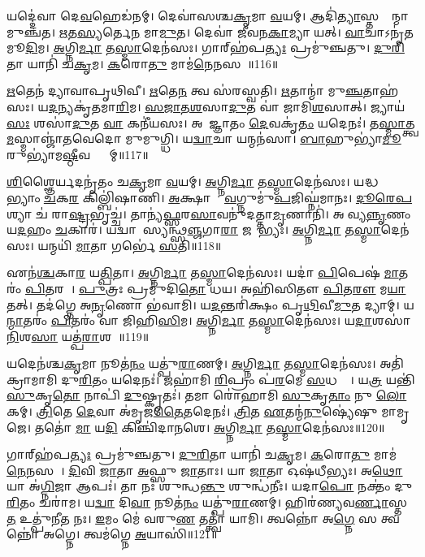 𑌯𑌦𑍍𑌦𑍇॑𑌵𑌾 𑌦𑍇\ul{𑌵}𑌹𑍇𑌡॑𑌨𑌮𑍍।
𑌦𑍇𑌵𑌾॑𑌸𑌶𑍍𑌚\ul{𑌕𑍃}𑌮𑌾 \ul{𑌵}𑌯𑌮𑍍।
𑌆𑌦𑌿॑\ul{𑌤𑍍𑌯𑌾}\-𑌸𑍍𑌤𑌸𑍍𑌮𑌾᳚𑌨𑍍𑌮𑌾 𑌮𑍁𑌞𑍍𑌚𑌤।
\ul{𑌋}𑌤\ul{𑌸𑍍𑌯}𑌰𑍍𑌤𑍇\ul{𑌨} 𑌮𑌾\ul{𑌮𑍁}𑌤।
𑌦𑍇𑌵𑌾॑ 𑌜𑍀𑌵𑌨\ul{𑌕𑌾}𑌮𑍍𑌯𑌾 𑌯𑌤𑍍।
\ul{𑌵𑌾}𑌚𑌾\-𑌽𑌨𑍃॑𑌤𑌮𑍂\ul{𑌦𑌿}𑌮।
\ul{𑌅}𑌗𑍍𑌨𑌿\ul{𑌰𑍍𑌮𑌾} 𑌤\ul{𑌸𑍍𑌮𑌾}𑌦𑍇𑌨॑𑌸𑌃।
𑌗𑌾𑌰𑍍‌\mbox{}𑌹॑𑌪\ul{𑌤𑍍𑌯𑌃} 𑌪𑍍𑌰𑌮𑍁॑𑌞𑍍𑌚𑌤𑍁।
\ul{𑌦𑍁}\ul{𑌰𑌿}𑌤𑌾 𑌯𑌾𑌨𑌿॑ 𑌚\ul{𑌕𑍃}𑌮।
\ul{𑌕}𑌰𑍋\ul{𑌤𑍁} 𑌮𑌾𑌮॑\ul{𑌨𑍇}𑌨𑌸𑌮𑍍᳚॥116॥

\ul{𑌋}𑌤𑍇𑌨॑ 𑌦𑍍𑌯𑌾𑌵𑌾𑌪𑍃𑌥𑌿𑌵𑍀।
\ul{𑌋}𑌤𑍇\ul{𑌨} 𑌤𑍍𑌵 𑌸॑𑌰𑌸𑍍𑌵𑌤𑌿।
\ul{𑌋}𑌤𑌾𑌨𑍍𑌮𑌾॑ 𑌮𑍁\ul{𑌞𑍍𑌚}𑌤𑌾𑌹॑𑌸𑌃।
𑌯\ul{𑌦}𑌨𑍍𑌯𑌕𑍃॑𑌤𑌮𑌾\ul{𑌰𑌿}𑌮।
\ul{𑌸}\ul{𑌜𑌾}\ul{𑌤}\ul{𑌶}\ul{}𑌸𑌾\ul{𑌦𑍁}𑌤 𑌵𑌾॑ 𑌜𑌾𑌮𑌿\ul{𑌶}\ul{}𑌸𑌾𑌤𑍍।
𑌜𑍍𑌯𑌾𑌯॑\ul{𑌸𑌃} 𑌶𑌸𑌾॑\ul{𑌦𑍁}𑌤 \ul{𑌵𑌾} 𑌕𑌨𑍀॑𑌯𑌸𑌃।
𑌅𑌨𑌾᳚𑌜𑍍𑌞𑌾𑌤𑌂 \ul{𑌦𑍇}𑌵𑌕𑍃॑\ul{𑌤𑌂} 𑌯𑌦𑍇𑌨𑌃॑।
𑌤\ul{𑌸𑍍𑌮𑌾}𑌤𑍍𑌤𑍍𑌵\ul{𑌮}𑌸𑍍𑌮𑌾𑌞𑍍𑌜𑌾॑𑌤𑌵𑍇𑌦𑍋 𑌮𑍁𑌮𑍁𑌗𑍍𑌧𑌿।
𑌯\ul{𑌦𑍍𑌵𑌾}𑌚𑌾 𑌯𑌨𑍍𑌮𑌨॑𑌸𑌾।
\ul{𑌬𑌾}𑌹𑍁𑌭𑍍𑌯𑌾॑\ul{𑌮𑍂}𑌰𑍁𑌭𑍍𑌯𑌾॑𑌮\ul{𑌷𑍍𑌠𑍀}𑌵𑌦𑍍𑌭𑍍𑌯𑌾᳚𑌮𑍍॥117॥

\ul{𑌶𑌿}𑌶𑍍𑌞𑍈𑌰𑍍𑌯𑌦𑌨𑍃॑𑌤𑌂 𑌚\ul{𑌕𑍃}𑌮𑌾 \ul{𑌵}𑌯𑌮𑍍।
\ul{𑌅}𑌗𑍍𑌨𑌿\ul{𑌰𑍍𑌮𑌾} 𑌤\ul{𑌸𑍍𑌮𑌾}𑌦𑍇𑌨॑𑌸𑌃।
𑌯𑌦𑍍𑌧𑌸𑍍𑌤𑌾᳚𑌭𑍍𑌯𑌾𑌂 \ul{𑌚}𑌕\ul{𑌰} 𑌕𑌿𑌲𑍍𑌬𑌿॑𑌷𑌾𑌣𑌿।
\ul{𑌅}𑌕𑍍𑌷𑌾𑌣𑌾𑌂᳚ \ul{𑌵}𑌗𑍍𑌨𑍁𑌮𑍁॑\ul{𑌪}𑌜𑌿𑌘𑍍𑌨॑𑌮𑌾𑌨𑌃।
\ul{𑌦𑍂}\ul{𑌰𑍇}\ul{𑌪}𑌶𑍍𑌯𑌾 𑌚॑ 𑌰𑌾\ul{𑌷𑍍𑌟𑍍𑌰}𑌭𑍃𑌚𑍍𑌚॑।
𑌤𑌾𑌨𑍍𑌯॑\ul{𑌫𑍍𑌸}𑌰\ul{𑌸𑌾}𑌵𑌨𑍁॑𑌦𑌤𑍍𑌤𑌾\ul{𑌮𑍃}𑌣𑌾𑌨𑌿॑।
𑌅𑌦𑍀᳚𑌵𑍍𑌯\ul{𑌨𑍍𑌨𑍃}𑌣𑌂 𑌯\ul{𑌦}𑌹𑌂 \ul{𑌚}𑌕𑌾𑌰॑।
𑌯𑌦𑍍𑌵𑌾𑌦𑌾᳚𑌸𑍍𑌯𑌨𑍍𑌥𑍍𑌸\ul{𑌞𑍍𑌜}𑌗𑌾\ul{𑌰𑌾} 𑌜𑌨𑍇᳚𑌭𑍍𑌯𑌃।
\ul{𑌅}𑌗𑍍𑌨𑌿\ul{𑌰𑍍𑌮𑌾} 𑌤\ul{𑌸𑍍𑌮𑌾}𑌦𑍇𑌨॑𑌸𑌃।
𑌯𑌨𑍍𑌮𑌯𑌿॑ \ul{𑌮𑌾}𑌤𑌾 𑌗𑌰𑍍𑌭𑍇॑ \ul{𑌸}𑌤𑌿॥118॥

𑌏𑌨॑\ul{𑌶𑍍𑌚}𑌕𑌾\ul{𑌰} 𑌯\ul{𑌤𑍍𑌪𑌿}𑌤𑌾।
\ul{𑌅}𑌗𑍍𑌨𑌿\ul{𑌰𑍍𑌮𑌾} 𑌤\ul{𑌸𑍍𑌮𑌾}𑌦𑍇𑌨॑𑌸𑌃।
𑌯𑌦𑌾॑ \ul{𑌪𑌿}𑌪𑍇𑌷॑ \ul{𑌮𑌾}𑌤𑌰𑌂॑ \ul{𑌪𑌿}𑌤𑌰𑌮𑍍᳚।
\ul{𑌪𑍁}𑌤𑍍𑌰𑌃 𑌪𑍍𑌰𑌮𑍁॑𑌦𑌿\ul{𑌤𑍋} 𑌧𑌯\sn{}।
𑌅𑌹𑌿॑𑌸𑌿𑌤𑍗 \ul{𑌪𑌿}𑌤\ul{𑌰𑍗} 𑌮\ul{𑌯𑌾} 𑌤𑌤𑍍।
𑌤𑌦॑𑌗𑍍𑌨𑍇 𑌅\ul{𑌨𑍃}𑌣𑍋 𑌭॑𑌵𑌾𑌮𑌿।
𑌯\ul{𑌦}𑌨𑍍𑌤𑌰𑌿॑𑌕𑍍𑌷𑌂 𑌪𑍃\ul{𑌥𑌿}𑌵𑍀\ul{𑌮𑍁}𑌤 𑌦𑍍𑌯𑌾𑌮𑍍।
𑌯\ul{𑌨𑍍𑌮𑌾}𑌤𑌰𑌂॑ \ul{𑌪𑌿}𑌤𑌰𑌂॑ 𑌵𑌾 𑌜𑌿𑌹𑌿\ul{𑌸𑌿}𑌮।
\ul{𑌅}𑌗𑍍𑌨𑌿\ul{𑌰𑍍𑌮𑌾} 𑌤\ul{𑌸𑍍𑌮𑌾}𑌦𑍇𑌨॑𑌸𑌃।
𑌯\ul{𑌦𑌾}𑌶𑌸𑌾॑ \ul{𑌨𑌿}𑌶\ul{𑌸𑌾} 𑌯𑌤𑍍𑌪॑\ul{𑌰𑌾}𑌶𑌸𑌾᳚॥119॥

𑌯𑌦𑍇𑌨॑𑌶𑍍𑌚\ul{𑌕𑍃}𑌮𑌾 𑌨𑍂𑌤॑\ul{𑌨𑌂} 𑌯𑌤𑍍𑌪𑍁॑\ul{𑌰𑌾}𑌣𑌮𑍍।
\ul{𑌅}𑌗𑍍𑌨𑌿\ul{𑌰𑍍𑌮𑌾} 𑌤\ul{𑌸𑍍𑌮𑌾}𑌦𑍇𑌨॑𑌸𑌃।
𑌅𑌤𑌿॑ 𑌕𑍍𑌰𑌾𑌮𑌾𑌮𑌿 𑌦𑍁\ul{𑌰𑌿}𑌤𑌂 𑌯𑌦𑍇𑌨𑌃॑।
𑌜𑌹𑌾॑𑌮𑌿 \ul{𑌰𑌿}𑌪𑍍𑌰𑌂 𑌪॑\ul{𑌰}𑌮𑍇 \ul{𑌸}𑌧𑌸𑍍𑌥𑍇᳚।
𑌯\ul{𑌤𑍍𑌰} 𑌯𑌨𑍍𑌤𑌿॑ \ul{𑌸𑍁}𑌕𑍃\ul{𑌤𑍋} 𑌨𑌾𑌪𑌿॑ \ul{𑌦𑍁}𑌷𑍍𑌕𑍃𑌤𑌃॑।
𑌤𑌮𑌾 𑌰𑍋॑𑌹𑌾𑌮𑌿 \ul{𑌸𑍁}𑌕𑍃\ul{𑌤𑌾𑌂} 𑌨𑍁 \ul{𑌲𑍋}𑌕𑌮𑍍।
\ul{𑌤𑍍𑌰𑌿}𑌤𑍇 \ul{𑌦𑍇}𑌵𑌾 𑌅॑𑌮𑍃𑌜\ul{𑌤𑍈}𑌤𑌦𑍇𑌨𑌃॑।
\ul{𑌤𑍍𑌰𑌿}𑌤 \ul{𑌏}𑌤𑌨𑍍𑌮॑\ul{𑌨𑍁}𑌷𑍍𑌯𑍇॑𑌷𑍁 𑌮𑌾𑌮𑍃𑌜𑍇।
𑌤𑌤𑍋॑ \ul{𑌮𑌾} 𑌯\ul{𑌦𑌿} 𑌕𑌿𑌞𑍍𑌚𑌿॑𑌦𑌾\ul{𑌨}𑌶𑍇।
\ul{𑌅}𑌗𑍍𑌨𑌿\ul{𑌰𑍍𑌮𑌾} 𑌤\ul{𑌸𑍍𑌮𑌾}𑌦𑍇𑌨॑𑌸𑌃॥120॥

𑌗𑌾𑌰𑍍‌\mbox{}𑌹॑𑌪\ul{𑌤𑍍𑌯𑌃} 𑌪𑍍𑌰𑌮𑍁॑𑌞𑍍𑌚𑌤𑍁।
\ul{𑌦𑍁}\ul{𑌰𑌿}𑌤𑌾 𑌯𑌾𑌨𑌿॑ 𑌚\ul{𑌕𑍃}𑌮।
\ul{𑌕}𑌰𑍋\ul{𑌤𑍁} 𑌮𑌾𑌮॑\ul{𑌨𑍇}𑌨𑌸𑌮𑍍᳚।
\ul{𑌦𑌿}𑌵𑌿 \ul{𑌜𑌾}𑌤𑌾 \ul{𑌅}𑌫𑍍𑌸𑍁 \ul{𑌜𑌾}𑌤𑌾𑌃।
𑌯𑌾 \ul{𑌜𑌾}𑌤𑌾 𑌓𑌷॑𑌧𑍀𑌭𑍍𑌯𑌃।
𑌅\ul{𑌥𑍋} 𑌯𑌾 𑌅॑\ul{𑌗𑍍𑌨𑌿}𑌜𑌾 𑌆𑌪𑌃॑।
𑌤𑌾 𑌨𑌃॑ 𑌶𑍁𑌨𑍍𑌧\ul{𑌨𑍍𑌤𑍁} 𑌶𑍁𑌨𑍍𑌧॑𑌨𑍀𑌃।
𑌯𑌦𑌾\ul{𑌪𑍋} 𑌨𑌕𑍍𑌤𑌂॑ 𑌦𑍁\ul{𑌰𑌿}𑌤𑌂 𑌚𑌰𑌾॑𑌮।
𑌯\ul{𑌦𑍍𑌵𑌾} 𑌦𑌿\ul{𑌵𑌾} 𑌨𑍂𑌤॑\ul{𑌨𑌂} 𑌯𑌤𑍍𑌪𑍁॑\ul{𑌰𑌾}𑌣𑌮𑍍।
𑌹𑌿𑌰॑𑌣𑍍𑌯𑌵\ul{𑌰𑍍𑌣𑌾}𑌸𑍍𑌤\ul{𑌤} 𑌉𑌤𑍍𑌪𑍁॑𑌨𑍀𑌤 𑌨𑌃।
\ul{𑌇}𑌮𑌂 𑌮𑍇॑ 𑌵𑌰𑍁\ul{𑌣} 𑌤𑌤𑍍𑌤𑍍𑌵𑌾॑ 𑌯𑌾𑌮𑌿।
𑌤𑍍𑌵𑌨𑍍𑌨𑍋॑ 𑌅\ul{𑌗𑍍𑌨𑍇} 𑌸 𑌤𑍍𑌵𑌨𑍍𑌨𑍋॑ 𑌅𑌗𑍍𑌨𑍇।
𑌤𑍍𑌵𑌮॑𑌗𑍍𑌨𑍇 \ul{𑌅}𑌯𑌾𑌸𑌿॑॥121॥

